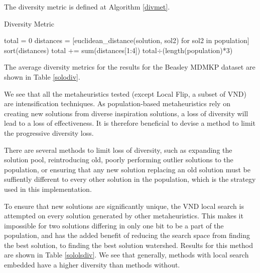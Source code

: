 \documentclass[11pt, letterpaper, onecolumn]{article}
\begin{document}
The diversity metric is defined at Algorithm \ref{divmet}. 



\begin{algorithm}
\caption{Diversity Metric}
\label{divmet}
\begin{algorithmic}
\STATE total = 0
\STATE distances = [euclidean\_distance(solution, sol2) for sol2 in population]
\STATE sort(distances)
\STATE total += sum(distances[1:4])
\ENDFOR
\RETURN total$\div$(length(population)*3)
\end{algorithmic}
\end{algorithm}

\clearpage
The average diversity metrics for the results for the Beasley MDMKP dataset are shown in Table \ref{solodiv}. 


\begin{table}[htbp]
\end{table}

We see that all the metaheuristics tested (except Local Flip, a subset of VND) are intensification techniques. As population-based metaheuristics rely on creating new solutions from diverse inspiration solutions, a loss of diversity will lead to a loss of effectiveness. It is therefore beneficial to devise a method to limit the progressive diversity loss. 

There are several methods to limit loss of diversity, such as expanding the solution pool, reintroducing old, poorly performing outlier solutions to the population, or ensuring that any new solution replacing an old solution must be suffiently different to every other solution in the population, which is the strategy used in this implementation. 

To ensure that new solutions are significantly unique, the VND local search is attempted on every solution generated by other metaheuristics. This makes it impossible for two solutions differing in only one bit to be a part of the population, and has the added benefit of reducing the search space from finding the best solution, to finding the best solution watershed. Results for this method are shown in Table \ref{sololsdiv}. We see that generally, methods with local search embedded have a higher diversity than methods without. 
\end{document}
